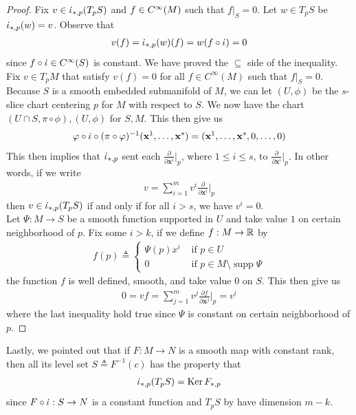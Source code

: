 \documentclass{report}
\begin{document}
\begin{proof}
Fix $v\in \dot{\iota}_{*,p}(T_pS)$ and $f\in C^{\infty}(M)$ such that $f|_S=0$. Let $w\in T_pS$ be $\dot{\iota}_{*,p}(w)=v $. Observe that 
\begin{align*}
v(f)=\dot{\iota}_{*,p}(w)(f)= w(f\circ \dot{\iota})=0
\end{align*}
since $f\circ \dot{\iota}\in C^{\infty}(S)$ is constant. We have proved the $\subseteq$ side of the inequality. \\

Fix $v \in T_pM$ that satisfy $v(f)=0$ for all $f\in C^{\infty}(M)$ such that $f|_S=0$. Because $S$ is a smooth embedded submanifold of  $M$, we can let $(U,\phi)$ be the $s$-slice chart centering $p$ for  $M$ with respect to  $S$. We now have the chart $(U\cap S,\pi \circ \phi),(U,\phi)$ for $S,M$. This then give us 
\begin{align*}
\varphi \circ \dot{\iota} \circ (\pi \circ \varphi )^{-1}(\textbf{x}^1,\dots ,\textbf{x}^s)=(\textbf{x}^1,\dots ,\textbf{x}^s ,0,\dots ,0)
\end{align*}
This then implies that $\dot{\iota}_{*,p}$ sent each $\frac{\partial }{\partial \textbf{x}^i}\big|_p$, where $1\leq i\leq s$, to $\frac{\partial }{\partial \textbf{x}^i}\big|_p$. In other words, if we write 
\begin{align*}
  v=\sum_{i=1}^m v^i \frac{\partial }{\partial \textbf{x}^i}\Big|_p
\end{align*}
then $v\in \dot{\iota}_{*,p}(T_pS)$ if and only if for all $i>s$, we have  $v^i=0$.\\

Let $\Psi:M\rightarrow S$ be a smooth function supported in $U$ and take value  $1$ on certain neighborhood of  $p$. Fix some $i>k$, if we define $f:M\rightarrow \mathbb{R}$ by 
 \begin{align*}
f(p)\triangleq \begin{cases}
  \Psi (p) x^i& \text{ if }p \in U \\
  0& \text{ if $p\in M \setminus \operatorname{supp}\Psi$}
\end{cases}
\end{align*}
the function $f$ is well defined, smooth, and take value $0$ on $S$. This then give us 
\begin{align*}
0=vf=\sum_{j=1}^m v^j \frac{\partial f}{\partial \textbf{x}^j}\Big|_p=v^i 
\end{align*}
where the last inequality hold true since $\Psi$ is constant on certain neighborhood of $p$. 
\end{proof}
\begin{mdframed}
Lastly, we pointed out that if $F:M\rightarrow N$ is a smooth map with constant rank, then all its level set $S\triangleq F^{-1}(c)$  has the property that 
\begin{align*}
\dot{\iota}_{*,p}(T_pS)= \operatorname{Ker}F_{*,p} 
\end{align*}
since $F\circ \dot{\iota}:S\rightarrow N$ is a constant function and $T_pS$ by   have dimension $m-k$. 
\end{mdframed}
\end{document}
